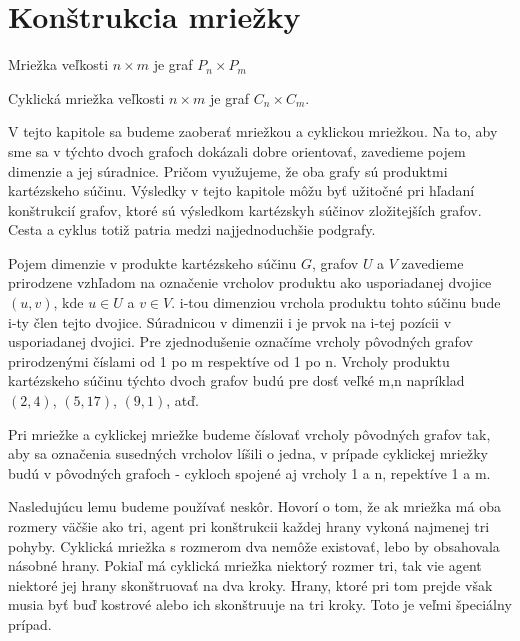 \chapter{Konštrukcia mriežky}
\begin{defin}
Mriežka veľkosti $ n \times m$ je graf $P_{n} \times P_{m}$
\end{defin}
\begin{defin}
Cyklická mriežka veľkosti $n \times m$ je graf $C_{n} \times C_{m}$.
\end{defin}

V tejto kapitole sa budeme zaoberať mriežkou a cyklickou mriežkou. Na to, aby sme sa v
týchto dvoch grafoch dokázali dobre orientovať, zavedieme pojem dimenzie a
jej súradnice. Pričom využujeme, že oba grafy sú produktmi kartézskeho
súčinu. Výsledky v tejto kapitole môžu byť užitočné pri hľadaní konštrukcií
grafov, ktoré sú výsledkom kartézskyh súčinov zložitejších grafov. Cesta a
cyklus totiž patria medzi najjednoduchšie podgrafy.

\begin{ozn}
Pojem dimenzie v produkte kartézskeho súčinu $G$, grafov $U$ a $V$ 
zavedieme prirodzene vzhľadom
na označenie vrcholov produktu ako usporiadanej dvojice $(u,v)$, kde $u \in
U$ a $v \in V$. i-tou dimenziou vrchola produktu tohto súčinu bude i-ty člen
tejto dvojice. Súradnicou v dimenzii i je prvok na i-tej pozícii v
usporiadanej dvojici. Pre zjednodušenie označíme vrcholy pôvodných grafov
prirodzenými číslami od 1 po m respektíve od 1 po n. Vrcholy produktu
kartézskeho súčinu týchto dvoch grafov budú pre dosť veľké m,n napríklad
$(2,4)$, $(5,17)$, $(9,1)$, atď.
\end{ozn}

\begin{pozn}
Pri mriežke a cyklickej mriežke budeme číslovať vrcholy pôvodných grafov
tak, aby sa označenia susedných vrcholov líšili o jedna, v prípade cyklickej
mriežky budú v pôvodných grafoch - cykloch spojené aj vrcholy 1 a n,
repektíve 1 a m.
\end{pozn}

Nasledujúcu lemu budeme používať neskôr. Hovorí o tom, že ak mriežka má oba
rozmery väčšie ako tri, agent pri konštrukcii každej hrany vykoná najmenej
tri pohyby. Cyklická mriežka s rozmerom dva nemôže existovať, lebo by
obsahovala násobné hrany. Pokiaľ má cyklická mriežka niektorý rozmer tri,
tak vie agent niektoré jej hrany skonštruovať na dva kroky. Hrany, 
ktoré pri tom
prejde však musia byť buď kostrové alebo ich skonštruuje na tri kroky. Toto
je veľmi špeciálny prípad.

